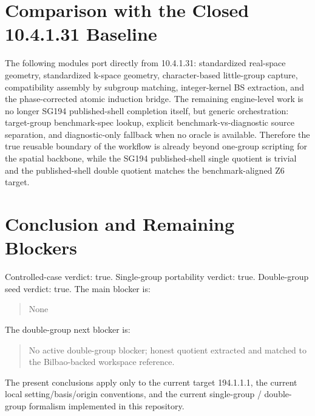 \documentclass[11pt]{article}
\begin{document}
\section{Comparison with the Closed 10.4.1.31 Baseline}
The following modules port directly from 10.4.1.31: standardized real-space geometry, standardized k-space geometry, character-based little-group capture, compatibility assembly by subgroup matching, integer-kernel BS extraction, and the phase-corrected atomic induction bridge. The remaining engine-level work is no longer SG194 published-shell completion itself, but generic orchestration: target-group benchmark-spec lookup, explicit benchmark-vs-diagnostic source separation, and diagnostic-only fallback when no oracle is available. Therefore the true reusable boundary of the workflow is already beyond one-group scripting for the spatial backbone, while the SG194 published-shell single quotient is trivial and the published-shell double quotient matches the benchmark-aligned Z6 target.

\section{Conclusion and Remaining Blockers}
Controlled-case verdict: true. Single-group portability verdict: true. Double-group seed verdict: true. The main blocker is:
\begin{quote}
None
\end{quote}
The double-group next blocker is:
\begin{quote}
No active double-group blocker; honest quotient extracted and matched to the Bilbao-backed workspace reference.
\end{quote}
The present conclusions apply only to the current target 194.1.1.1, the current local setting/basis/origin conventions, and the current single-group / double-group formalism implemented in this repository.
\end{document}

